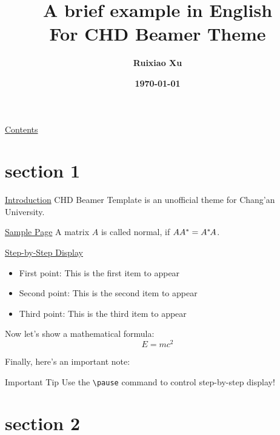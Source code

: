 \documentclass[11pt,aspectratio=43,xcolor={dvipsnames},hyperref={pdftex,pdfpagemode=UseNone,hidelinks,pdfdisplaydoctitle=true},usepdftitle=false]{ctexbeamer}
\title[CHD Beamer Template]{A brief example in English \\ \normalsize{For CHD Beamer Theme}}
\author{\textbf{Ruixiao Xu}}
\institute{School of Information Engineering\\Chang'an University}
\date{\textbf{\today}}
\begin{document}
\begin{frame}
  \maketitle
\end{frame}

\begin{frame}{\underline{Contents}}
  \tableofcontents
\end{frame}

\section{section 1}
\begin{frame}{\underline{Introduction}}
  \alert{CHD Beamer Template} is an unofficial theme for Chang'an University.
\end{frame}

\begin{frame}{\underline{Sample Page}}
  A matrix $A$ is called normal, if $AA^*=A^*\mskip-2muA$.
\end{frame}

\begin{frame}{\underline{Step-by-Step Display}}
  \begin{itemize}
    \item First point: This is the first item to appear
    \pause
    \item Second point: This is the second item to appear
    \pause  
    \item Third point: This is the third item to appear
    \pause
  \end{itemize}
  
  \vspace{0.5cm}
  
  Now let's show a mathematical formula:
  \pause
  \begin{equation}
    E = mc^2
  \end{equation}
  \pause
  
  Finally, here's an important note:
  \pause
  \begin{alertblock}{Important Tip}
    Use the \texttt{\textbackslash pause} command to control step-by-step display!
  \end{alertblock}
\end{frame}

\section{section 2}
\end{document}
